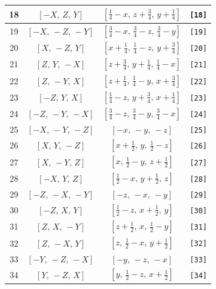 \documentclass[fleqn,8pt]{jsarticle}
\begin{document}
\begin{longtable}{cccc}
18 & $\left[ - X,\, Z,\, Y \right]$ & $\left[ \frac{1}{4} - x,\, z + \frac{3}{4},\, y + \frac{1}{4} \right]$ & {\tt [18]} \\ \hline
19 & $\left[ - X,\, - Z,\, - Y \right]$ & $\left[ \frac{3}{4} - x,\, \frac{3}{4} - z,\, \frac{3}{4} - y \right]$ & {\tt [19]} \\ \hline
20 & $\left[ X,\, - Z,\, Y \right]$ & $\left[ x + \frac{1}{4},\, \frac{1}{4} - z,\, y + \frac{3}{4} \right]$ & {\tt [20]} \\ \hline
21 & $\left[ Z,\, Y,\, - X \right]$ & $\left[ z + \frac{3}{4},\, y + \frac{1}{4},\, \frac{1}{4} - x \right]$ & {\tt [21]} \\ \hline
22 & $\left[ Z,\, - Y,\, X \right]$ & $\left[ z + \frac{1}{4},\, \frac{1}{4} - y,\, x + \frac{3}{4} \right]$ & {\tt [22]} \\ \hline
23 & $\left[ - Z,\, Y,\, X \right]$ & $\left[ \frac{1}{4} - z,\, y + \frac{3}{4},\, x + \frac{1}{4} \right]$ & {\tt [23]} \\ \hline
24 & $\left[ - Z,\, - Y,\, - X \right]$ & $\left[ \frac{3}{4} - z,\, \frac{3}{4} - y,\, \frac{3}{4} - x \right]$ & {\tt [24]} \\ \hline
25 & $\left[ - X,\, - Y,\, - Z \right]$ & $\left[ - x,\, - y,\, - z \right]$ & {\tt [25]} \\ \hline
26 & $\left[ X,\, Y,\, - Z \right]$ & $\left[ x + \frac{1}{2},\, y,\, \frac{1}{2} - z \right]$ & {\tt [26]} \\ \hline
27 & $\left[ X,\, - Y,\, Z \right]$ & $\left[ x,\, \frac{1}{2} - y,\, z + \frac{1}{2} \right]$ & {\tt [27]} \\ \hline
28 & $\left[ - X,\, Y,\, Z \right]$ & $\left[ \frac{1}{2} - x,\, y + \frac{1}{2},\, z \right]$ & {\tt [28]} \\ \hline
29 & $\left[ - Z,\, - X,\, - Y \right]$ & $\left[ - z,\, - x,\, - y \right]$ & {\tt [29]} \\ \hline
30 & $\left[ - Z,\, X,\, Y \right]$ & $\left[ \frac{1}{2} - z,\, x + \frac{1}{2},\, y \right]$ & {\tt [30]} \\ \hline
31 & $\left[ Z,\, X,\, - Y \right]$ & $\left[ z + \frac{1}{2},\, x,\, \frac{1}{2} - y \right]$ & {\tt [31]} \\ \hline
32 & $\left[ Z,\, - X,\, Y \right]$ & $\left[ z,\, \frac{1}{2} - x,\, y + \frac{1}{2} \right]$ & {\tt [32]} \\ \hline
33 & $\left[ - Y,\, - Z,\, - X \right]$ & $\left[ - y,\, - z,\, - x \right]$ & {\tt [33]} \\ \hline
34 & $\left[ Y,\, - Z,\, X \right]$ & $\left[ y,\, \frac{1}{2} - z,\, x + \frac{1}{2} \right]$ & {\tt [34]} \\ \hline

\end{longtable}
\end{document}
